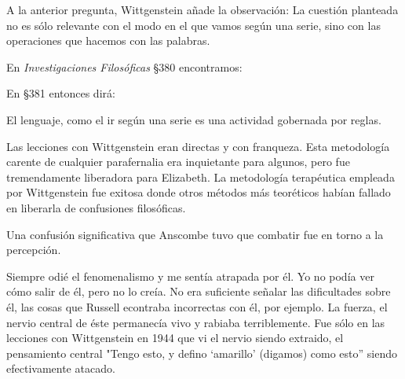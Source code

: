 A la anterior pregunta, Wittgenstein añade la observación:
La cuestión planteada no es sólo relevante con el modo en el que vamos según una
serie, sino con las operaciones que hacemos con las palabras. 

En \emph{Investigaciones Filosóficas} \S380
encontramos:

En \S381 entonces dirá:


\autocite{anscombe2011plato:rnpl}

El lenguaje, como el ir según una serie es una actividad gobernada por reglas.



Las lecciones con Wittgenstein eran directas y con franqueza. Esta metodología
carente de cualquier parafernalia era inquietante para algunos, pero fue
tremendamente liberadora para Elizabeth. La metodología terapéutica empleada por
Wittgenstein fue exitosa donde otros métodos más teoréticos habían fallado en
liberarla de confusiones filosóficas.\autocite[loc 9853 Chapter 4, Section 24,
\S5]{monk1991duty}

Una confusión significativa que Anscombe tuvo que combatir fue en torno a la
percepción.

Siempre odié el fenomenalismo y me sentía atrapada por él. Yo no podía ver cómo
salir de él, pero no lo creía. No era suficiente señalar las dificultades sobre
él, las cosas que Russell econtraba incorrectas con él, por ejemplo. La fuerza,
el nervio central de éste permanecía vivo y rabiaba terriblemente. Fue sólo en
las lecciones con Wittgenstein en 1944 que vi el nervio siendo extraido, el
pensamiento central "Tengo esto, y defino `amarillo' (digamos) como esto''
siendo efectivamente atacado.



